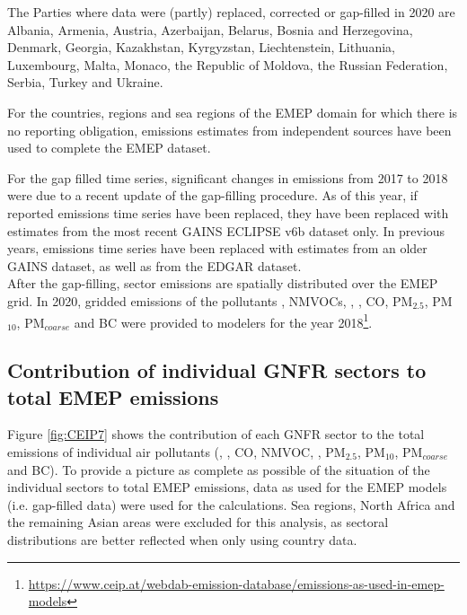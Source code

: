 The Parties where data were (partly) replaced, corrected or gap-filled in 2020 are Albania, Armenia, Austria, Azerbaijan, Belarus, Bosnia and Herzegovina, Denmark, Georgia, Kazakhstan, Kyrgyzstan, Liechtenstein, Lithuania, Luxembourg,  Malta, Monaco, the Republic of Moldova, the Russian Federation, Serbia, Turkey and Ukraine.

For the countries, regions and sea regions of the EMEP domain for which there is no reporting obligation, emissions estimates from independent sources %
have been used to complete the EMEP dataset.

For the gap filled time series, significant changes in emissions from 2017 to 2018 were due to a recent update of the gap-filling procedure. As of this year, if reported emissions time series have been replaced, they have been replaced with estimates from the most recent GAINS ECLIPSE v6b dataset only. In previous years, emissions time series have been replaced with estimates from an older GAINS dataset, as well as from the EDGAR dataset.\\

After the gap-filling, sector emissions are spatially distributed over the EMEP grid. In 2020, gridded emissions of the pollutants \nox, NMVOCs, \sox, \nhiii, CO, PM$_{2.5}$, PM$_{10}$, PM$_{coarse}$ and BC were provided to modelers for the year 2018\footnote{\url{https://www.ceip.at/webdab-emission-database/emissions-as-used-in-emep-models}}.


\subsection{Contribution of individual GNFR sectors to total EMEP emissions}

Figure \ref{fig:CEIP7} shows the contribution of each GNFR sector to the
total emissions of individual air pollutants (\sox, \nox, CO, NMVOC,
\nhiii, PM$_{2.5}$, PM$_{10}$, PM$_{coarse}$ and BC). To provide a picture as complete as possible of the situation of the individual sectors to total EMEP emissions, data as used for the EMEP models (i.e. gap-filled data) were used for the calculations. %
Sea regions, North Africa and the remaining Asian areas were excluded for this analysis, as sectoral distributions are better reflected when only using country data. 

